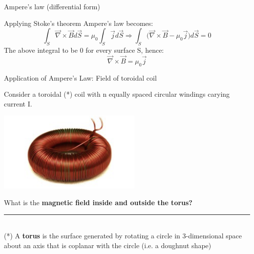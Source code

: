 \begin{frame}{Ampere's law (differential form)}
\vspace{0.3cm}

Applying Stoke's theorem Ampere's law becomes:
\begin{equation*}
    \int_{S} \vec{\nabla} \times \vec{B} d\vec{S} = \mu_0 \int_{S} \vec{j} d\vec{S} \Rightarrow
    \int_{S} \Big( \vec{\nabla} \times \vec{B} - \mu_0 \vec{j} \Big)  d\vec{S} = 0
\end{equation*}
The above integral to be 0 for every surface S, hence:
\begin{equation*}
    \vec{\nabla} \times \vec{B} = \mu_0 \vec{j}
\end{equation*}

\end{frame}


%
%
%


\begin{frame}{Application of Ampere's Law: Field of toroidal coil}

Consider a toroidal (*) coil with n equally spaced circular windings carying current I.\\
\vspace{0.1cm}

\begin{center}
     \includegraphics[width=0.53\textwidth]{./images/photos/toroidal_coil.png}
\end{center}

What is the {\bf magnetic field inside and outside the torus?}\\

\vspace{0.1cm}
\noindent\rule{2cm}{0.4pt}\\
{\small
   (*) A {\bf torus} is the surface generated by rotating a circle in 3-dimensional space about
       an axis that is coplanar with the circle (i.e. a doughnut shape)
}

\end{frame}



